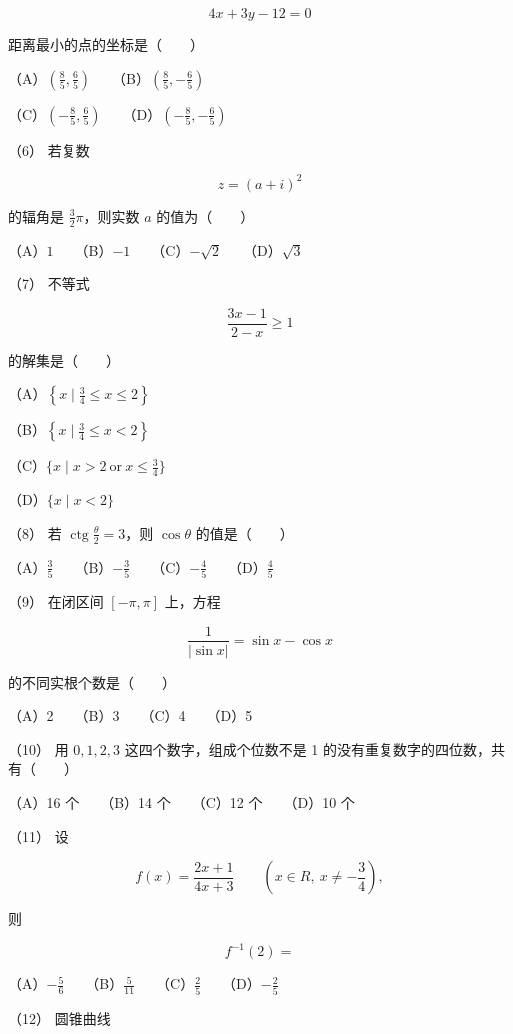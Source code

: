 \begin{answer}
\nopagebreak[4]
\[
4x+3y-12=0
\]

距离最小的点的坐标是\mbox{（　　）}

（A）$\left(\frac85,\frac65\right)$　　（B）$\left(\frac85,-\frac65\right)$

（C）$\left(-\frac85,\frac65\right)$　　（D）$\left(-\frac85,-\frac65\right)$

（6） 若复数

\nopagebreak[4]
\[
z=(a+i)^2
\]

的辐角是 $\frac32\pi$，则实数 $a$ 的值为\mbox{（　　）}

（A）$1$　　（B）$-1$　　（C）$-\sqrt2$　　（D）$\sqrt3$

（7） 不等式

\nopagebreak[4]
\[
\frac{3x-1}{2-x}\geq1
\]

的解集是\mbox{（　　）}

（A）$\left\{x\mid\frac34\leq x\leq2\right\}$

（B）$\left\{x\mid\frac34\leq x<2\right\}$

（C）$\{x\mid x>2\ \mathrm{or}\ x\leq\frac34\}$

（D）$\{x\mid x<2\}$

（8） 若 $\operatorname{ctg}\frac\theta2=3$，则 $\cos\theta$ 的值是\mbox{（　　）}

（A）$\frac35$　　（B）$-\frac35$　　（C）$-\frac45$　　（D）$\frac45$

（9） 在闭区间 $[-\pi,\pi]$ 上，方程

\nopagebreak[4]
\[
\frac1{|\sin x|}=\sin x-\cos x
\]

的不同实根个数是\mbox{（　　）}

（A）2　　（B）3　　（C）4　　（D）5

（10） 用 $0,1,2,3$ 这四个数字，组成个位数不是 1 的没有重复数字的四位数，共有\mbox{（　　）}

（A）16 个　　（B）14 个　　（C）12 个　　（D）10 个

（11） 设

\nopagebreak[4]
\[
f(x)=\frac{2x+1}{4x+3}\qquad(x\in R,\ x\ne-\frac34),
\]

则

\nopagebreak[4]
\[
f^{-1}(2)=
\]

（A）$-\frac56$　　（B）$\frac5{11}$　　（C）$\frac25$　　（D）$-\frac25$

（12） 圆锥曲线


\end{answer}
